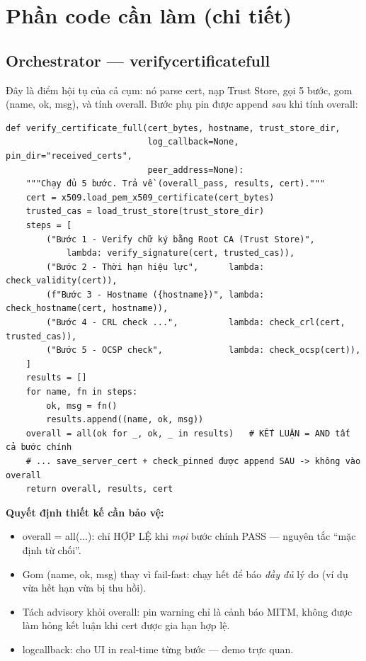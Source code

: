 \documentclass[12pt,a4paper]{article}
\newcommand{\code}[1]{{\ttfamily\small\def\_{\textunderscore\discretionary{}{}{}}#1}}
\begin{document}
\section{Phần code cần làm (chi tiết)}

\subsection{Orchestrator --- \code{verify\_certificate\_full}}

Đây là điểm hội tụ của cả cụm: nó parse cert, nạp Trust Store, gọi 5 bước, gom
\code{(name, ok, msg)}, và tính \code{overall}. Bước phụ pin được append \emph{sau}
khi tính overall:

\begin{Verbatim}
def verify_certificate_full(cert_bytes, hostname, trust_store_dir,
                            log_callback=None, pin_dir="received_certs",
                            peer_address=None):
    """Chạy đủ 5 bước. Trả về (overall_pass, results, cert)."""
    cert = x509.load_pem_x509_certificate(cert_bytes)
    trusted_cas = load_trust_store(trust_store_dir)
    steps = [
        ("Bước 1 - Verify chữ ký bằng Root CA (Trust Store)",
            lambda: verify_signature(cert, trusted_cas)),
        ("Bước 2 - Thời hạn hiệu lực",      lambda: check_validity(cert)),
        (f"Bước 3 - Hostname ({hostname})", lambda: check_hostname(cert, hostname)),
        ("Bước 4 - CRL check ...",          lambda: check_crl(cert, trusted_cas)),
        ("Bước 5 - OCSP check",             lambda: check_ocsp(cert)),
    ]
    results = []
    for name, fn in steps:
        ok, msg = fn()
        results.append((name, ok, msg))
    overall = all(ok for _, ok, _ in results)   # KẾT LUẬN = AND tất cả bước chính
    # ... save_server_cert + check_pinned được append SAU -> không vào overall
    return overall, results, cert
\end{Verbatim}

\textbf{Quyết định thiết kế cần bảo vệ:}
\begin{itemize}
  \item \code{overall = all(...)}: chỉ HỢP LỆ khi \emph{mọi} bước chính PASS ---
        nguyên tắc ``mặc định từ chối''.
  \item Gom \code{(name, ok, msg)} thay vì fail-fast: chạy hết để báo \emph{đầy
        đủ} lý do (ví dụ vừa hết hạn vừa bị thu hồi).
  \item Tách advisory khỏi \code{overall}: pin warning chỉ là cảnh báo MITM,
        không được làm hỏng kết luận khi cert được gia hạn hợp lệ.
  \item \code{log\_callback}: cho UI in real-time từng bước --- demo trực quan.
\end{itemize}
\end{document}
